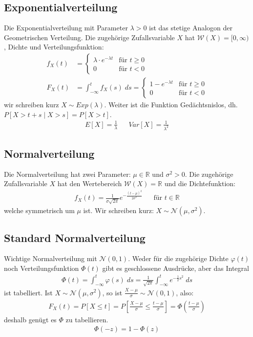 \documentclass[8pt]{extarticle}
\newcommand{\R}{\mathbb{R}}
\newcommand{\W}{\mathcal{W}}
\newcommand{\vp}{\varphi}
\newcommand{\cond}[2]{P[#1 \; | \; #2]}
\newcommand{\Normalverteilt}{\mathcal{N}(\mu, \sigma^2)}
\newcommand{\Standardnormalverteilt}{\mathcal{N}(0, 1)}
\begin{document}
\begin{multicols*}{3}
  \subsection*{Exponentialverteilung}
  Die Exponentialverteilung mit Parameter $\lambda > 0$ ist das stetige Analogon
  der Geometrischen Verteilung. Die zugehörige Zufallsvariable $X$ hat
  $\W(X) = [0, \infty)$, Dichte und Verteilungsfunktion:
  \begin{align*}
    f_X(t) & =
    \begin{cases}
      \lambda \cdot e^{-\lambda t} & \text{für } t \geq 0 \\
      0                            & \text{für }t < 0
    \end{cases} \\
    F_X(t) & =
    \int_{-\infty}^t f_X(s) \; ds =
    \begin{cases}
      1 - e^{-\lambda t} & \text{für } t \geq 0 \\
      0                  & \text{für }t < 0
    \end{cases}
  \end{align*}
  wir schreiben kurz $X \sim Exp(\lambda)$. Weiter ist
  die Funktion Gedächtsnislos, dh. $\cond{X > t + s}{X > s} = P[X > t]$.
  \begin{align*}
    E[X] = \frac{1}{\lambda} &  & Var[X] = \frac{1}{\lambda^2}
  \end{align*}
  \subsection*{Normalverteilung}
  Die Normalverteilung hat zwei Parameter: $\mu \in \R$ und $\sigma^2 > 0$. Die
  zugehörige Zufallsvariable $X$ hat den Wertebereich $\W(X) = \R$ und die
  Dichtefunktion:
  \begin{align*}
    f_X(t) = \frac{1}{\sigma \sqrt{2 \pi}} e^{- \frac{(t - \mu)^2}{2 \sigma^2}}
     &  & \text{für } t \in \R
  \end{align*}
  welche symmetrisch um $\mu$ ist. Wir schreiben kurz: $X \sim \Normalverteilt$.
  \subsection*{Standard Normalverteilung}
  Wichtige Normalverteilung mit $\Standardnormalverteilt$. Weder für
  die zugehörige Dichte $\vp(t)$ noch Verteilungsfunktion $\Phi(t)$
  gibt es geschlossene Ausdrücke, aber das Integral
  \begin{align*}
    \Phi(t) = \int_{-\infty}^t \vp(s) \; ds =
    \frac{1}{\sqrt{2\pi}} \int_{-\infty}^t e^{-\frac{1}{2} s^2} \; ds
  \end{align*}
  ist tabelliert. Ist $X \sim \Normalverteilt$, so ist
  $\frac{X - \mu}{\sigma} \sim \Standardnormalverteilt$, also:
  \begin{align*}
    F_X(t) = P[X \leq t] = P \left[ \frac{X-\mu}{\sigma} \leq \frac{t - \mu}{\sigma} \right] = \Phi \left ( \frac{t - \mu}{\sigma} \right)
  \end{align*}
  deshalb genügt es $\Phi$ zu tabellieren.
  \begin{align*}
    \Phi(-z) = 1 - \Phi(z)
  \end{align*}

\end{multicols*}
\end{document}
